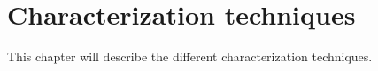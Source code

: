 
\chapter{Characterization techniques}
This chapter will describe the different characterization techniques. 